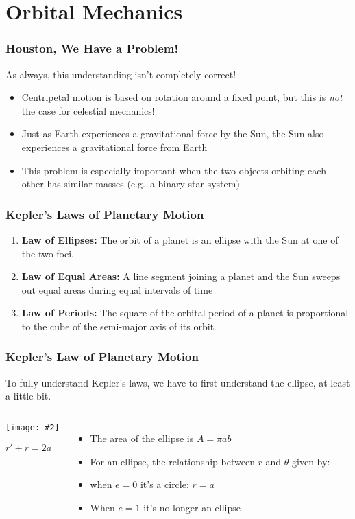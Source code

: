 \documentclass[12pt,compress,aspectratio=169]{beamer}
\newcommand{\pic}[2]{\texttt{[image: \#2]}}
\newcommand{\eq}[2]{\vspace{#1}{\Large\begin{displaymath}#2\end{displaymath}}}
\begin{document}
\section{Orbital Mechanics}


\begin{frame}
  \frametitle{Houston, We Have a Problem!}
  As always, this understanding isn't completely correct!
  \begin{itemize}
  \item Centripetal motion is based on rotation around a fixed point, but this
    is \emph{not} the case for celestial mechanics!
  \item Just as Earth experiences a gravitational force by the Sun, the Sun
    also experiences a gravitational force from Earth
  \item This problem is especially important when the two objects orbiting each
    other has similar masses (e.g.\ a binary star system)
  \end{itemize}
\end{frame}


\begin{frame}
  \frametitle{Kepler's Laws of Planetary Motion}
  \begin{enumerate}
  \item\textbf{Law of Ellipses:} The orbit of a planet is an ellipse with the
    Sun at one of the two foci.
  \item\textbf{Law of Equal Areas:} A line segment joining a planet and the Sun
    sweeps out equal areas during equal intervals of time
  \item \textbf{Law of Periods:} The square of the orbital period of a planet
    is proportional to the cube of the semi-major axis of its orbit.
  \end{enumerate}
\end{frame}


\begin{frame}
  \frametitle{Kepler's Law of Planetary Motion}
  To fully understand Kepler's laws, we have to first understand the ellipse,
  at least a little bit.

  \begin{columns}
    \begin{center}
      \pic{1.25}{elliporb.png}
      
      $r' + r =2a$
    \end{center}

    \begin{itemize}
    \item The area of the ellipse is $A=\pi ab$
    \item For an ellipse, the relationship between $r$ and $\theta$ given by:

      \eq{-.35in}{
        r=\frac{a(1-e^2)}{1+e\cos\theta}
        \quad\textnormal{\normalsize where}\quad
        0\leq e < 1
      }
    \item when $e=0$ it's a circle: $r=a$
    \item When $e=1$ it's no longer an ellipse
    \end{itemize}
  \end{columns}
\end{frame}
\end{document}
